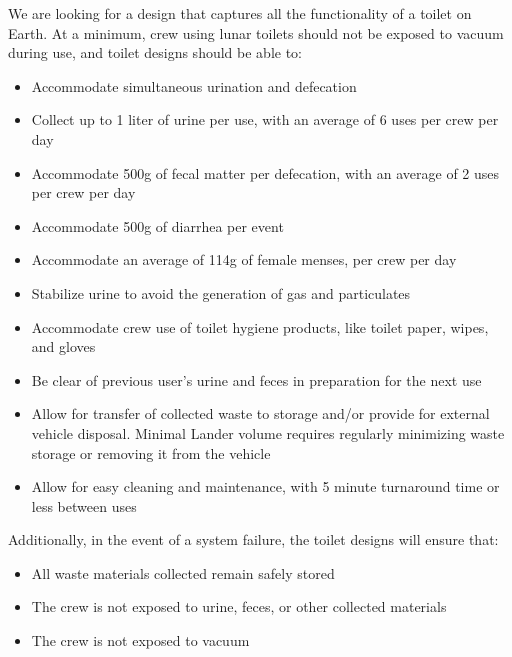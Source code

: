     We are looking for a design that captures all the functionality of a toilet on Earth.  At a minimum, crew using lunar toilets should not be exposed to vacuum during use, and toilet designs should be able to:

    \begin{itemize}
        \item Accommodate simultaneous urination and defecation
        \item Collect up to 1 liter of urine per use, with an average of 6 uses per crew per day
        \item Accommodate 500g of fecal matter per defecation, with an average of 2 uses per crew per day
        \item Accommodate 500g of diarrhea per event
        \item Accommodate an average of 114g of female menses, per crew per day
        \item Stabilize urine to avoid the generation of gas and particulates
        \item Accommodate crew use of toilet hygiene products, like toilet paper, wipes, and gloves
        \item Be clear of previous user’s urine and feces in preparation for the next use
        \item Allow for transfer of collected waste to storage  and/or provide for external vehicle disposal. Minimal Lander volume requires regularly minimizing waste storage or removing it from the vehicle
        \item Allow for easy cleaning and maintenance, with 5 minute turnaround time or less between uses
    \end{itemize}

    Additionally, in the event of a system failure, the toilet designs will ensure that:

    \begin{itemize}
        \item All waste materials collected remain safely stored
        \item The crew is not exposed to urine, feces, or other collected materials
        \item The crew is not exposed to vacuum
    \end{itemize}



